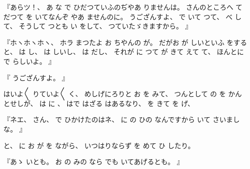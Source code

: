 『あらツ！、
%
あ
な
で
ひだつていふのぢやあ
りませんは。
%
さんのところへ
て
だつて
を
いてなんぞ
やあ
ませんのに。
%
うござんすよ、
%
で
いて
つて、
%
べ
して、
%
そうして
つとも
い
をして、
%
つていたゞきますから。
』

『ホヽホヽホヽ、
%
ホラ
まつたよ
お
ちやんの
が。
%
だがお
が
しいといふ
をすると、
%
は
し、
%
は
しいし、
%
は
だし、
%
それが
に
つて
が
きて
えて
て、
%
ほんとに
で
らしいよ。
』

『
うござんすよ。
』

はいよ〳〵
りていよ〳〵
く、
%
めしげにろりと
お
を
みて、
%
つんとして
の
を
かんとせしが、
%
は
に
、
%
はで
はざる
はあるなり、
%
を
きて
を
げ、

『ネエ、
%
さん、
%
で
ひかけたのはネ、
%
に
の
ひの
なんですから
いて
さいましな。
』

と、
%
に
お
が
を
ながら、
%
いつはりならず
を
めて
ひ
したり。

『あゝ
いとも。
%
お
の
みの
なら
でも
いてあげるとも。
』

